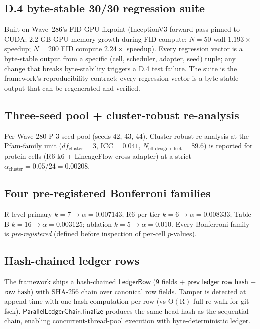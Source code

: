 \documentclass[journal,twocolumn,final]{IEEEtran}
\begin{document}
\subsection{D.4 byte-stable 30/30 regression suite}

Built on Wave~286's FID GPU fixpoint (InceptionV3 forward pass pinned to CUDA;
2.2 GB GPU memory growth during FID compute; $N=50$ wall $1.193\times$ speedup;
$N=200$ FID compute $2.24\times$ speedup). Every regression vector is a
byte-stable output from a specific (cell, scheduler, adapter, seed) tuple; any
change that breaks byte-stability triggers a D.4 test failure. The suite is the
framework's reproducibility contract: every regression vector is a
byte-stable output that can be regenerated and verified.

\subsection{Three-seed pool + cluster-robust re-analysis}

Per Wave 280 P 3-seed pool (seeds 42, 43, 44). Cluster-robust re-analysis at
the Pfam-family unit ($df_\mathrm{cluster} = 3$, $\mathrm{ICC} = 0.041$,
$N_\mathrm{eff\_design\_effect} = 89.6$) is reported for protein cells (R6 k6
+ LineageFlow cross-adapter) at a strict $\alpha_\mathrm{cluster} = 0.05/24 =
0.00208$.

\subsection{Four pre-registered Bonferroni families}

R-level primary $k=7 \to \alpha = 0.007143$; R6 per-tier $k=6 \to \alpha =
0.008333$; Table B $k=16 \to \alpha = 0.003125$; ablation $k=5 \to \alpha =
0.010$. Every Bonferroni family is \emph{pre-registered} (defined before
inspection of per-cell $p$-values).

\subsection{Hash-chained ledger rows}

The framework ships a hash-chained $\mathsf{LedgerRow}$ ($\mathsf{9}$ fields +
$\mathsf{prev\_ledger\_row\_hash}$ + $\mathsf{row\_hash}$) with SHA-256 chain
over canonical row fields. Tamper is detected at append time with one hash
computation per row (vs $\mathrm{O}(\mathrm{R})$ full re-walk for git fsck).
$\mathsf{ParallelLedgerChain.finalize}$ produces the same head hash as the
sequential chain, enabling concurrent-thread-pool execution with
byte-deterministic ledger.
\end{document}

